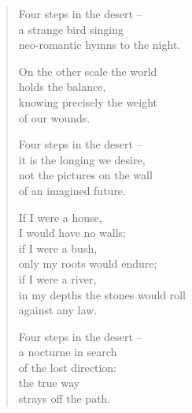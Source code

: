 \begin{verse}
Four steps in the desert --\\
a strange bird singing\\
neo-romantic hymns to the night.

On the other scale the world\\
holds the balance,\\
knowing precisely the weight\\
of our wounds.

Four steps in the desert --\\
it is the longing we desire,\\
not the pictures on the wall\\
of an imagined future.

If I were a house,\\
I would have no walls;\\
if I were a bush,\\
only my roots would endure;\\
if I were a river,\\
in my depths the stones would roll\\
against any law.

\clearpage

Four steps in the desert --\\
a nocturne in search\\
of the lost direction:\\
the true way\\
strays off the path.
\end{verse}

